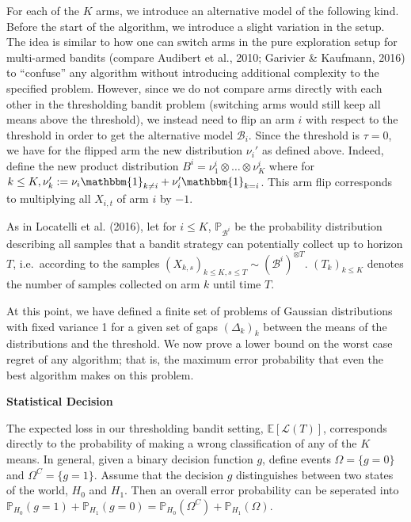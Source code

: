 \documentclass[11pt,]{article}
\begin{document}
For each of the \(K\) arms, we introduce an alternative model of the
following kind. Before the start of the algorithm, we introduce a slight
variation in the setup. The idea is similar to how one can switch arms
in the pure exploration setup for multi-armed bandits (compare Audibert
et al., 2010; Garivier \& Kaufmann, 2016) to ``confuse'' any algorithm
without introducing additional complexity to the specified problem.
However, since we do not compare arms directly with each other in the
thresholding bandit problem (switching arms would still keep all means
above the threshold), we instead need to flip an arm \(i\) with respect
to the threshold in order to get the alternative model
\(\mathcal{B}_i\). Since the threshold is \(\tau = 0\), we have for the
flipped arm the new distribution \(\nu_i'\) as defined above. Indeed,
define the new product distribution
\(B^i = \nu_1^i \otimes \dots \otimes \nu_K^i\) where for
\(k \leq K, \nu_k' := \nu_i \mathbbm{1}_{k \neq i} + \nu_i' \mathbbm{1}_{k=i}\).
This arm flip corresponds to multiplying all \(X_{i,t}\) of arm \(i\) by
\(-1\).

As in Locatelli et al. (2016), let for \(i \leq K\),
\(\mathbb{P}_{\mathcal{B}^i}\) be the probability distribution
describing all samples that a bandit strategy can potentially collect up
to horizon \(T\), i.e.~according to the samples
\((X_{k,s})_{k\leq K, s \leq T} \sim (\mathcal{B}^i)^{\otimes T}\).
\((T_k)_{k\leq K}\) denotes the number of samples collected on arm \(k\)
until time \(T\).

At this point, we have defined a finite set of problems of Gaussian
distributions with fixed variance 1 for a given set of gaps
\((\Delta_k)_k\) between the means of the distributions and the
threshold. We now prove a lower bound on the worst case regret of any
algorithm; that is, the maximum error probability that even the best
algorithm makes on this problem.

\textbf{Statistical Decision}

The expected loss in our thresholding bandit setting,
\(\mathbb{E}[\mathcal{L}(T)]\), corresponds directly to the probability
of making a wrong classification of any of the \(K\) means. In general,
given a binary decision function \(g\), define events
\(\Omega = \{g = 0\}\) and \(\Omega^C = \{g = 1\}\). Assume that the
decision \(g\) distinguishes between two states of the world, \(H_0\)
and \(H_1\). Then an overall error probability can be seperated into
\(\mathbb{P}_{H_0}(g=1) + \mathbb{P}_{H_1}(g = 0) = \mathbb{P}_{H_0}(\Omega^C) + \mathbb{P}_{H_1}(\Omega)\).
\end{document}
